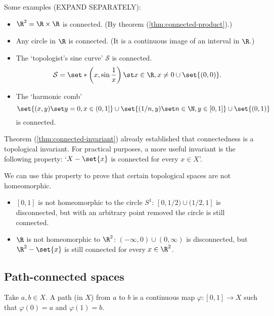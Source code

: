 \begin{negg}
  Some examples (EXPAND SEPARATELY):
  \begin{itemize}
  \item $\R^2 = \R \times \R$ is connected. (By theorem (\ref{thm:connected-product}).)
  \item Any circle in $\R$ is connected. (It is a continuous image of an interval in $\R$.)
  \item The `topologist's sine curve' $\mathcal{S}$ is connected.
  \begin{equation*}
    \mathcal{S} = \set*{\left(x, \sin\frac{1}{x}\right) \st x \in \R, x \neq 0} \cup \set{(0,0)}.
  \end{equation*}
  \item The `harmonic comb'
  \begin{equation*}
    \set{(x,y) \set y=0, x \in (0,1]} \cup \set{(1/n, y) \set n \in \N, y \in [0,1]} \cup \set{(0,1)}
  \end{equation*}
  is connected.\eggqed
  \end{itemize}
\end{negg}

Theorem (\ref{thm:connected-invariant}) already established that connectedness is a topological invariant. For practical purposes, a more useful invariant is the following property: `$X-\set{x}$ is connected for every $x \in X$'.

\begin{negg}
  We can use this property to prove that certain topological spaces are not homeomorphic.
  \begin{itemize}
  \item $[0,1]$ is not homeomorphic to the circle $S^1$: $[0,1/2)\cup(1/2,1]$ is disconnected, but with an arbitrary point removed the circle is still connected.

  \item $\R$ is not homeomorphic to $\R^2$: $(-\infty,0)\cup(0,\infty)$ is disconnected, but $\R^2 - \set{x}$ is still connected for every $x \in \R^2$.\eggqed
  \end{itemize}
\end{negg}

\subsection{Path-connected spaces}
\begin{ndfn}[Path]
  Take $a,b \in X$. A path (in $X$) from $a$ to $b$ is a continuous map $\varphi: [0,1] \to X$ such that $\varphi(0)=a$ and $\varphi(1)=b$.
\end{ndfn}


